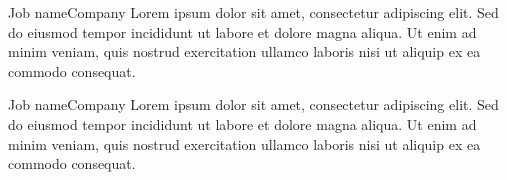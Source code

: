 \titleForExperience

\begin{itemize}
    \begin{workEntry}{Job name}{Company}{}
        Lorem ipsum dolor sit amet, consectetur adipiscing elit. Sed do eiusmod tempor incididunt ut labore et dolore magna aliqua. Ut enim ad minim veniam, quis nostrud exercitation ullamco laboris nisi ut aliquip ex ea commodo consequat.
    \end{workEntry}

    \begin{workEntry}{Job name}{Company}{}
         Lorem ipsum dolor sit amet, consectetur adipiscing elit. Sed do eiusmod tempor incididunt ut labore et dolore magna aliqua. Ut enim ad minim veniam, quis nostrud exercitation ullamco laboris nisi ut aliquip ex ea commodo consequat.
    \end{workEntry}
\end{itemize}

